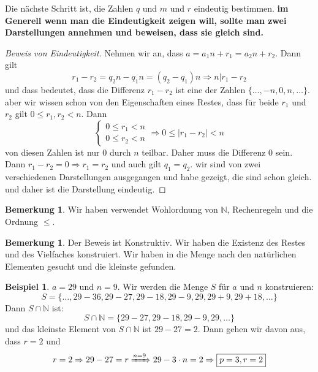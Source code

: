 \documentclass{article}
\theoremstyle{definition}
\newtheorem{bem}[definition]{Bemerkung}
\newtheorem*{bei*}{Beispiel}
\theoremstyle{plain}
\begin{document}
\noindent Die nächste Schritt ist, die Zahlen $ q $ und $ m $ und $ r $ eindeutig bestimmen. \textbf{im Generell wenn man die Eindeutigkeit zeigen will, sollte man zwei Darstellungen annehmen und beweisen, dass sie gleich sind.}
\begin{proof}[Beweis von Eindeutigkeit]
	Nehmen wir an, dass 
	$ a = a_1n + r_1 = a_2n + r_2 $. Dann gilt
	\[ 
	r_1 - r_2 = q_2n - q_1n = (q_2 - q_1)n \Rightarrow n|r_1 - r_2
	 \]
	und dass bedeutet, dass die Differenz $ r_1 - r_2 $ ist eine der Zahlen
	$ \{ \ldots , -n , 0 , n , \ldots \} $. aber wir wissen schon von den Eigenschaften eines Restes, dass für beide $ r_1 $ und $ r_2 $ gilt $ 0 \leq r_1 , r_2 < n $. Dann
	\[ 
	\left\{
	\begin{array}{l}
		0 \leq r_1 < n \\
		0 \leq r_2 < n 
	\end{array} 
	\right. \Rightarrow 0 \leq |r_1 - r_2| < n
	 \]
	 von diesen Zahlen ist nur $ 0 $ durch $ n $ teilbar. Daher muss die Differenz $ 0 $ sein. Dann
	 $ r_1 - r_2 = 0 \Rightarrow r_1 = r_2 $ und auch gilt $ q_1 = q_2 $. wir sind von zwei verschiedenen Darstellungen ausgegangen und habe gezeigt, die sind schon gleich. und daher ist die Darstellung eindeutig.
\end{proof}
\begin{bem}
	Wir haben verwendet Wohlordnung von $ \mathbb{N} $, Rechenregeln und die Ordnung $ \leq $.
\end{bem}
\begin{bem}
	Der Beweis ist Konstruktiv. Wir haben die Existenz des Restes und des Vielfaches konstruiert. Wir haben in die Menge nach den natürlichen Elementen gesucht und die kleinste gefunden.  
\end{bem}
\begin{bei*}
	$ a = 29 $ und $ n = 9 $. Wir werden die Menge $ S $ für $ a $ und $ n $ konstruieren: 
	\[ 
	S = \{ \ldots , 29 - 36 , 29 - 27 , 29 - 18 , 29 - 9 , 29 , 29 + 9 , 29 + 18 , \ldots \}
	 \]
	Dann $ S \cap \mathbb{N} $ ist:
	\[ 
	S \cap \mathbb{N} = \{ 29-27 , 29-18 , 29-9 , 29 , \ldots \}
	 \]
	 und das kleinste Element von $ S \cap \mathbb{N} $ ist $ 29 - 27 = 2 $. Dann gehen wir davon aus, dass $ r = 2 $ und
	 \[ 
	 r = 2 \Rightarrow 29 - 27 = r \xRightarrow{n = 9} 29 - 3 \cdot n = 2 \Rightarrow \boxed{p = 3, r=2}  
	  \]
\end{bei*}
\end{document}
